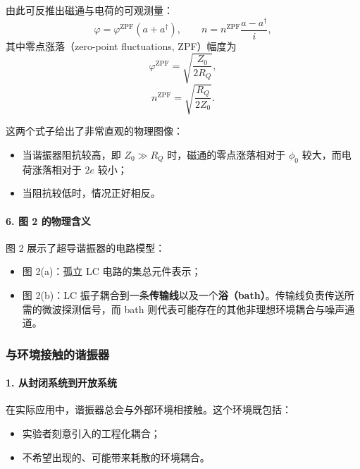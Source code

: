 \documentclass[12pt,a4paper,oneside]{ctexbook}
\begin{document}
由此可反推出磁通与电荷的可观测量：
\[
    \varphi=\varphi^{\mathrm{ZPF}}(a+a^\dagger),
    \qquad
    n=n^{\mathrm{ZPF}}\frac{a-a^\dagger}{i},
\]
其中零点涨落（zero-point fluctuations, ZPF）幅度为
\begin{equation}
    \varphi^{\mathrm{ZPF}}=\sqrt{\frac{Z_0}{2R_Q}},
    \tag{6}
\end{equation}
\begin{equation}
    n^{\mathrm{ZPF}}=\sqrt{\frac{R_Q}{2Z_0}}.
    \tag{7}
\end{equation}

这两个式子给出了非常直观的物理图像：
\begin{itemize}[leftmargin=2em]
    \item 当谐振器阻抗较高，即 \(Z_0\gg R_Q\) 时，磁通的零点涨落相对于 \(\phi_0\) 较大，而电荷涨落相对于 \(2e\) 较小；
    \item 当阻抗较低时，情况正好相反。
\end{itemize}

\paragraph{6. 图 2 的物理含义}

图 2 展示了超导谐振器的电路模型：
\begin{itemize}[leftmargin=2em]
    \item 图 2(a)：孤立 LC 电路的集总元件表示；
    \item 图 2(b)：LC 振子耦合到一条\textbf{传输线}以及一个\textbf{浴（bath）}。传输线负责传送所需的微波探测信号，而 bath 则代表可能存在的其他非理想环境耦合与噪声通道。
\end{itemize}

\subsubsection{与环境接触的谐振器}

\paragraph{1. 从封闭系统到开放系统}

在实际应用中，谐振器总会与外部环境相接触。这个环境既包括：
\begin{itemize}[leftmargin=2em]
    \item 实验者刻意引入的工程化耦合；
    \item 不希望出现的、可能带来耗散的环境耦合。
\end{itemize}
\end{document}
